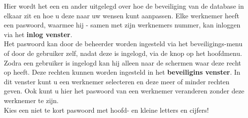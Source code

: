Hier wordt het een en ander uitgelegd over hoe de beveiliging van de
database in elkaar zit en hoe u deze naar uw wensen kunt aanpassen.
Elke werknemer heeft een paswoord, waarmee hij - samen met zijn
werknemers nummer, kan inloggen via het \textbf{inlog venster}.\\
Het paswoord kan door de beheerder worden ingesteld via het
beveiligings-menu of door de gebruiker zelf, nadat deze is ingelogd,
via de knop op het hoofdmenu.\\
Zodra een gebruiker is ingelogd kan hij alleen naar de schermen waar
deze recht op heeft. Deze rechten kunnen worden ingesteld in het
\textbf{beveiligins venster}. In dit venster kunt u een werknemer
selecteren en deze meer of minder rechten geven. Ook kunt u hier het
paswoord van een werknemer veranderen zonder deze werknemer te
zijn.\\
Kies een niet te kort paswoord met hoofd- en kleine letters en
cijfers!

